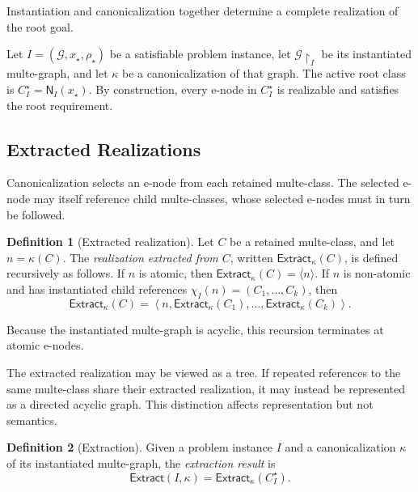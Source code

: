 \documentclass[sigconf,nonacm]{acmart}
\theoremstyle{definition}
\newtheorem{definition}{Definition}[section]
\theoremstyle{plain}
\theoremstyle{remark}
\begin{document}
Instantiation and canonicalization together determine a complete
realization of the root goal.

Let \(I=(\mathcal G,x_\star,\rho_\star)\)
be a satisfiable problem instance, let
\(\mathcal G\!\restriction_I\)
be its instantiated multe-graph, and let \(\kappa\)
be a canonicalization of that graph.
The active root class is
\(C^\star_I=\mathsf N_I(x_\star)\).
By construction, every e-node in \(C^\star_I\) is realizable and
satisfies the root requirement.

\subsection{Extracted Realizations}
\label{sec:extracted-realizations}

Canonicalization selects an e-node from each retained multe-class.
The selected e-node may itself reference child multe-classes, whose
selected e-nodes must in turn be followed.

\begin{definition}[Extracted realization]
Let \(C\) be a retained multe-class, and let \(n=\kappa(C)\).
The \emph{realization extracted from \(C\)}, written
\(\mathsf{Extract}_{\kappa}(C)\),
is defined recursively as follows.
If \(n\) is atomic, then
\(\mathsf{Extract}_{\kappa}(C) = \langle n\rangle\).
If \(n\) is non-atomic and has instantiated child references
\(\chi_I(n)=(C_1,\ldots,C_k)\),
then
\[
\mathsf{Extract}_{\kappa}(C)
=
\left\langle
n,
\mathsf{Extract}_{\kappa}(C_1),
\ldots,
\mathsf{Extract}_{\kappa}(C_k)
\right\rangle.
\]
\end{definition}

Because the instantiated multe-graph is acyclic, this recursion
terminates at atomic e-nodes.

The extracted realization may be viewed as a tree.  If repeated
references to the same multe-class share their extracted
realization, it may instead be represented as a directed acyclic
graph.  This distinction affects representation but not semantics.

\begin{definition}[Extraction]
Given a problem instance \(I\) and a canonicalization \(\kappa\) of
its instantiated multe-graph, the \emph{extraction result} is
\[
\mathsf{Extract}(I,\kappa)
=
\mathsf{Extract}_{\kappa}(C^\star_I).
\]
\end{definition}
\end{document}
